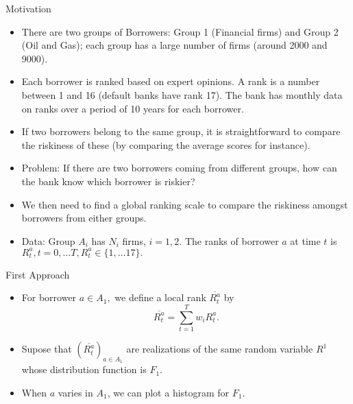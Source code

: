 \documentclass[newPxFont,sthlmFooter]{beamer}
\begin{document}
\maketitle

\begin{frame}{Motivation}
\begin{itemize}
\item There are two groups of Borrowers: Group 1 (Financial firms) and Group 2 (Oil and Gas); each group has a large number of firms (around 2000 and 9000). \justifying
\item Each borrower is ranked based on expert opinions. A rank is a number between 1 and 16 (default banks have rank 17). The bank has monthly data on ranks over a period of 10 years for each borrower. \justifying
\item If two borrowers belong to the same group, it is straightforward to compare the riskiness of these (by comparing the average scores for instance).
\end{itemize} 
\end{frame}

\begin{frame}
\begin{itemize}
\item Problem: If there are two borrowers coming from different groups, how can the bank know which borrower is riskier? \justifying
\item We then need to find a global ranking scale to compare the riskiness amongst borrowers from either groups.
\item Data: Group $A_i$ has $N_i$ firms, $i=1, 2.$ The ranks of borrower $a$ at time $t$ is $R^a_t, t=0,\dots T, R^a_t\in\{1,\dots 17\}.$
\end{itemize}
\end{frame}



\begin{frame}{First Approach}
\begin{itemize}
\item For borrower $a\in A_1,$ we define a local rank $\overline{R_t^a}$ by
$$\overline{R_t^a}=\sum_{t=1}^Tw_iR_t^a.$$
\item Supose that $(\overline{R_t^a})_{a\in A_1}$ are realizations of the same random variable $R^1$ whose distribution  function is $F_1.$
\item When $a$ varies in $A_1$, we can plot a histogram for $F_1.$
\end{itemize}
\end{frame}
\end{document}
